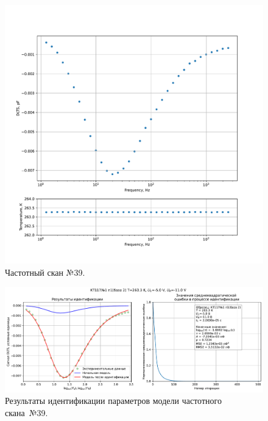 \begin{figure}[!ht]
    \centering
    \includegraphics[width=1\textwidth]{../plots/КТ117№1_п1(база 2)_2500Гц-1Гц_1пФ_-10С_-5В-11В_100мВ_20мкс_шаг_0,1.pdf}
    \caption{Частотный скан №39.}
    \label{pic:frequency_scan_39}
\end{figure}

\begin{figure}[!ht]
    \centering
    \includegraphics[width=1\textwidth]{../plots/КТ117№1_п1(база 2)_2500Гц-1Гц_1пФ_-10С_-5В-11В_100мВ_20мкс_шаг_0,1_model.pdf}
    \caption{Результаты идентификации параметров модели частотного скана~№39.}
    \label{pic:frequency_scan_model39}
\end{figure}

\pagebreak


